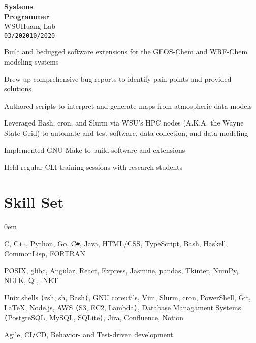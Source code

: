 \documentclass[10pt]{article}
\newenvironment{itemize*}%
  {\begin{itemize}[leftmargin=*,label=\faChevronRight]%
    \setlength{\itemsep}{0pt}%
    \setlength{\parskip}{0pt}%
    \setlength{\parsep}{0pt}}%
  {\end{itemize}}
\newcommand\workexp[5]{
    \begin{minipage}[t]{0.215\textwidth}
            \raggedleft
                \textbf{\fontsize{13}{10}\selectfont #1}\\ 
                #2\\
                \small\texttt{#3}\textendash \texttt{#4}
    \end{minipage}\hspace*{5pt}%
    \begin{minipage}[t]{0.75\textwidth}
        \raggedright
        \fontsize{10}{10}\selectfont#5
    \end{minipage}
}
\begin{document}
\workexp{Systems\\ Programmer}{WSU\textendash Huang Lab}{03/2020}{10/2020}{%
    \begin{itemize*}
        \item Built and bedugged software extensions for the GEOS-Chem and WRF-Chem modeling systems
        \item Drew up comprehensive bug reports to identify pain points and provided solutions
        \item Authored scripts to interpret and generate maps from atmospheric data models
        \item Leveraged Bash, cron, and Slurm via WSU's HPC nodes (A.K.A. the Wayne State Grid) to automate and test software, 
              data collection, and data modeling
        \item Implemented GNU Make to build software and extensions
        \item Held regular CLI training sessions with research students
    \end{itemize*}%
}

\vspace*{-10pt}
\section*{Skill Set}
\vspace*{-8pt}\hspace*{10pt}\begin{minipage}{0.935\textwidth}
    \begin{description}
        \itemsep0em
        \raggedright
        \item[Languages] C, C\texttt{++}, Python, Go, C\texttt{\#}, Java, HTML/CSS, TypeScript, Bash, Haskell, CommonLisp, FORTRAN
        \item[Frameworks\texttt{/}Libraries] POSIX, glibc, Angular, React, Express, Jasmine, pandas, Tkinter, NumPy, NLTK,
            Qt, .NET
        \item[Tools] Unix shells \texttt{(}zsh, sh, Bash\texttt{)}, GNU coreutils, Vim, Slurm, cron, PowerShell, Git, \LaTeX, Node.js,
            AWS \texttt{(}S3, EC2, Lambda\texttt{)}, Database Managament Systems \texttt{(}PostgreSQL, MySQL, SQLite\texttt{)}, Jira, Confluence, Notion
        \item[Methodologies] Agile, CI\texttt{/}CD, Behavior- and Test-driven development
    \end{description}
\end{minipage}
\end{document}
